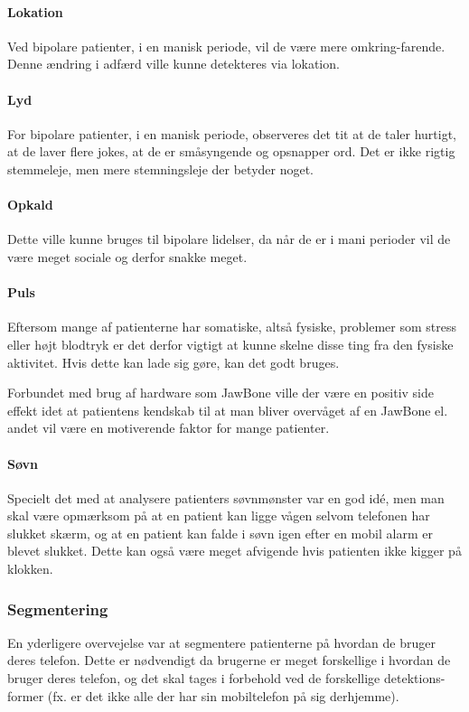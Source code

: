 \paragraph{Lokation}
Ved bipolare patienter, i en manisk periode, vil de være mere omkring-farende.
Denne ændring i adfærd ville kunne detekteres via lokation.

\paragraph{Lyd}
For bipolare patienter, i en manisk periode, observeres det tit at de taler hurtigt, at de laver flere jokes, at de er småsyngende og opsnapper ord. Det er ikke rigtig stemmeleje, men mere stemningsleje der betyder noget.

\paragraph{Opkald}
Dette ville kunne bruges til bipolare lidelser, da når de er i mani perioder vil de være meget sociale og derfor snakke meget. 

\paragraph{Puls}
Eftersom mange af patienterne har somatiske, altså fysiske, problemer som stress eller højt blodtryk er det derfor vigtigt at kunne skelne disse ting fra den fysiske aktivitet.
Hvis dette kan lade sig gøre, kan det godt bruges. 

Forbundet med brug af hardware som JawBone ville der være en positiv side effekt idet at patientens kendskab til at man bliver overvåget af en JawBone el. andet vil være en motiverende faktor for mange patienter.

\paragraph{Søvn}
Specielt det med at analysere patienters søvnmønster var en god idé, men man skal være opmærksom på at en patient kan ligge vågen selvom telefonen har slukket skærm, og at en patient kan falde i søvn igen efter en mobil alarm er blevet slukket.
Dette kan også være meget afvigende hvis patienten ikke kigger på klokken.

\subsubsection{Segmentering}
En yderligere overvejelse var at segmentere patienterne på hvordan de bruger deres telefon.
Dette er nødvendigt da brugerne er meget forskellige i hvordan de bruger deres telefon, og det skal tages i forbehold ved de forskellige detektions-former (fx. er det ikke alle der har sin mobiltelefon på sig derhjemme).

